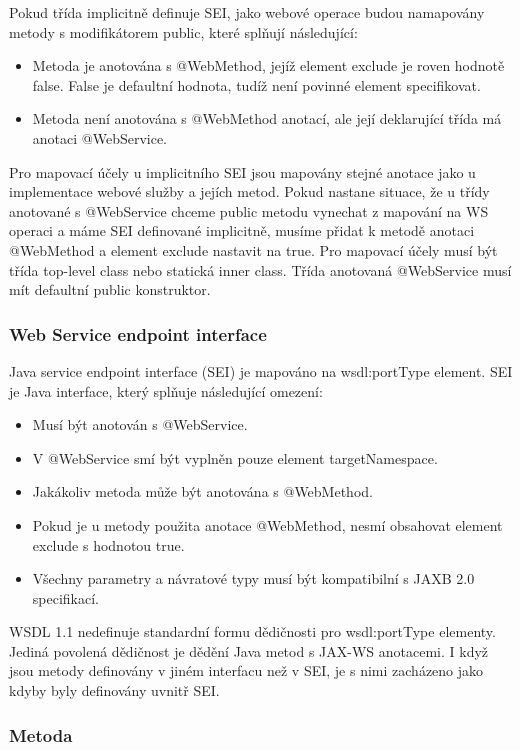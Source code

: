 \documentclass[11pt,twoside,a4paper]{book}
\begin{document}
Pokud třída implicitně definuje SEI, jako webové operace budou namapovány metody s
modifikátorem public, které splňují následující:
\begin{itemize}
  \item Metoda je anotována s @WebMethod, jejíž element exclude je roven hodnotě false.
False je defaultní hodnota, tudíž není povinné element specifikovat.
  \item Metoda není anotována s @WebMethod anotací, ale její deklarující třída má anotaci
@WebService.
\end{itemize}

Pro mapovací účely u implicitního SEI jsou mapovány stejné anotace jako u implementace
webové služby a jejích metod. Pokud nastane situace, že u třídy anotované s @WebService
chceme public metodu vynechat z mapování na WS operaci a máme SEI definované
implicitně, musíme přidat k metodě anotaci @WebMethod a element exclude nastavit na true.
Pro mapovací účely musí být třída top-level class nebo statická inner class. Třída anotovaná
@WebService musí mít defaultní public konstruktor.

\subsubsection{Web Service endpoint interface}
Java service endpoint interface (SEI) je mapováno na wsdl:portType element. SEI je Java
interface, který splňuje následující omezení:

\begin{itemize}
  \item Musí být anotován s @WebService.
  \item V @WebService smí být vyplněn pouze element targetNamespace.
  \item Jakákoliv metoda může být anotována s @WebMethod.
  \item Pokud je u metody použita anotace @WebMethod, nesmí obsahovat element exclude s
hodnotou true.
  \item Všechny parametry a návratové typy musí být kompatibilní s JAXB 2.0 specifikací.
\end{itemize}

WSDL 1.1 nedefinuje standardní formu dědičnosti pro wsdl:portType elementy. Jediná
povolená dědičnost je dědění Java metod s JAX-WS anotacemi. I když jsou metody
definovány v jiném interfacu než v SEI, je s nimi zacházeno jako kdyby byly definovány
uvnitř SEI.

\subsubsection{Metoda}
\end{document}
